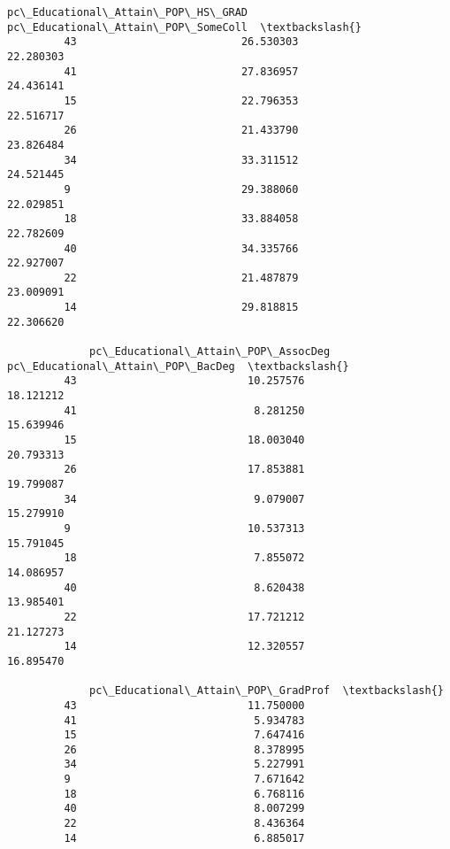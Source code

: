 \documentclass[11pt]{article}
\begin{document}
\begin{Verbatim}[commandchars=\\\{\}]
             pc\_Educational\_Attain\_POP\_HS\_GRAD  pc\_Educational\_Attain\_POP\_SomeColl  \textbackslash{}
         43                          26.530303                           22.280303   
         41                          27.836957                           24.436141   
         15                          22.796353                           22.516717   
         26                          21.433790                           23.826484   
         34                          33.311512                           24.521445   
         9                           29.388060                           22.029851   
         18                          33.884058                           22.782609   
         40                          34.335766                           22.927007   
         22                          21.487879                           23.009091   
         14                          29.818815                           22.306620   
         
             pc\_Educational\_Attain\_POP\_AssocDeg  pc\_Educational\_Attain\_POP\_BacDeg  \textbackslash{}
         43                           10.257576                         18.121212   
         41                            8.281250                         15.639946   
         15                           18.003040                         20.793313   
         26                           17.853881                         19.799087   
         34                            9.079007                         15.279910   
         9                            10.537313                         15.791045   
         18                            7.855072                         14.086957   
         40                            8.620438                         13.985401   
         22                           17.721212                         21.127273   
         14                           12.320557                         16.895470   
         
             pc\_Educational\_Attain\_POP\_GradProf  \textbackslash{}
         43                           11.750000   
         41                            5.934783   
         15                            7.647416   
         26                            8.378995   
         34                            5.227991   
         9                             7.671642   
         18                            6.768116   
         40                            8.007299   
         22                            8.436364   
         14                            6.885017   
         

\end{Verbatim}
\end{document}
